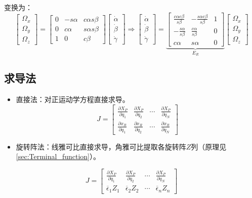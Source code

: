 \documentclass[
12pt, %
a4paper, 
oneside, %
headinclude,footinclude, %
]{scrartcl}
\begin{document}
\begin{itemize}
变换为：
$$
\begin{bmatrix} \Omega_x \\ \Omega_y \\ \Omega_z \end{bmatrix}
= \begin{bmatrix} 0 & -s\alpha & c\alpha s\beta \\ 0 & c\alpha & s\alpha s\beta \\ 1 & 0 & c\beta \end{bmatrix} \begin{bmatrix} \dot{\alpha} \\ \dot{\beta} \\ \dot{\gamma} \end{bmatrix}
\Rightarrow \begin{bmatrix} \dot{\alpha} \\ \dot{\beta} \\ \dot{\gamma} \end{bmatrix}
= \underbrace{\begin{bmatrix} \frac{c\alpha c\beta}{s\beta} & -\frac{s\alpha c\beta}{s\beta} & 1 \\ -\frac{s\alpha}{s\beta} & \frac{c\alpha}{s\beta} & 0 \\ c\alpha & s\alpha & 0 \end{bmatrix}}_{E_R} \begin{bmatrix} \Omega_x \\ \Omega_y \\ \Omega_z \end{bmatrix}
$$
\end{itemize} 
\subsection[求导法]{求导法}
\begin{itemize}
\item 直接法：对正运动学方程直接求导。
$$ J = \begin{bmatrix} \frac{\partial X_P}{\partial q_1} & \frac{\partial X_P}{\partial q_2} & \cdots & \frac{\partial X_P}{\partial q_N} \\ \frac{\partial x_R}{\partial q_1} & \frac{\partial x_R}{\partial q_2} & \cdots & \frac{\partial x_R}{\partial q_N} \end{bmatrix} $$
\item 旋转阵法：线雅可比直接求导，角雅可比提取各旋转阵$ Z $列（原理见\ref{sec:Terminal_function}）。\label{sec:Terminal_function_back}
\end{itemize} 
$$ J = \begin{bmatrix} \frac{\partial X_P}{\partial q_1} & \frac{\partial X_P}{\partial q_2} & \cdots & \frac{\partial X_P}{\partial q_N} \\ \overline{\epsilon}_1 Z_1 & \overline{\epsilon}_2 Z_2 & \cdots & \overline{\epsilon}_n Z_n \end{bmatrix} $$
\end{document}
